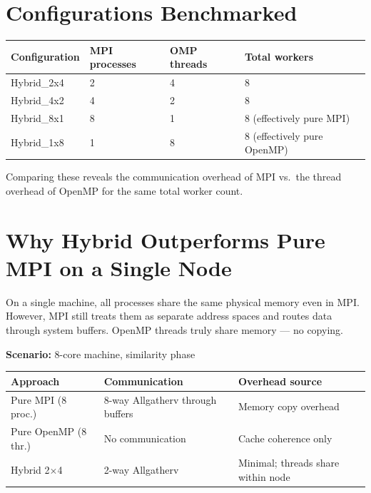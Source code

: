 \documentclass[12pt,a4paper]{article}
\begin{document}
\section{Configurations Benchmarked}

\begin{center}
\begin{tabular}{llll}
\toprule
Configuration & MPI processes & OMP threads & Total workers \\
\midrule
Hybrid\_2x4 & 2 & 4 & 8 \\
Hybrid\_4x2 & 4 & 2 & 8 \\
Hybrid\_8x1 & 8 & 1 & 8 (effectively pure MPI) \\
Hybrid\_1x8 & 1 & 8 & 8 (effectively pure OpenMP) \\
\bottomrule
\end{tabular}
\end{center}

Comparing these reveals the communication overhead of MPI vs.\ the thread
overhead of OpenMP for the same total worker count.

\section{Why Hybrid Outperforms Pure MPI on a Single Node}

On a single machine, all processes share the same physical memory even in MPI.
However, MPI still treats them as separate address spaces and routes data
through system buffers.  OpenMP threads truly share memory — no copying.

\textbf{Scenario:} 8-core machine, similarity phase
\begin{center}
\begin{tabular}{lll}
\toprule
Approach & Communication & Overhead source \\
\midrule
Pure MPI (8 proc.) & 8-way Allgatherv through buffers & Memory copy overhead \\
Pure OpenMP (8 thr.) & No communication & Cache coherence only \\
Hybrid 2$\times$4 & 2-way Allgatherv & Minimal; threads share within node \\
\bottomrule
\end{tabular}
\end{center}
\end{document}
